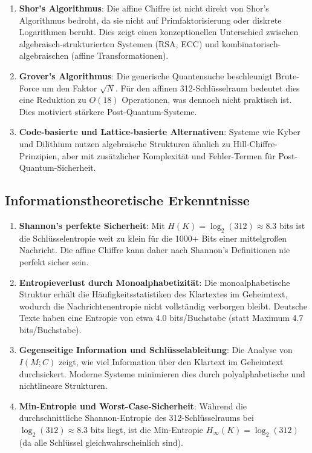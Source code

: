 ﻿\documentclass[12pt,a4paper]{article}
\begin{document}
	\begin{enumerate}
		\item \textbf{Shor's Algorithmus}: Die affine Chiffre ist nicht direkt von Shor's Algorithmus bedroht, da sie nicht auf Primfaktorisierung oder diskrete Logarithmen beruht. Dies zeigt einen konzeptionellen Unterschied zwischen algebraisch-strukturierten Systemen (RSA, ECC) und kombinatorisch-algebraischen (affine Transformationen).
		
		\item \textbf{Grover's Algorithmus}: Die generische Quantensuche beschleunigt Brute-Force um den Faktor $\sqrt{N}$. Für den affinen 312-Schlüsselraum bedeutet dies eine Reduktion zu $O(18)$ Operationen, was dennoch nicht praktisch ist. Dies motiviert stärkere Post-Quantum-Systeme.
		
		\item \textbf{Code-basierte und Lattice-basierte Alternativen}: Systeme wie Kyber und Dilithium nutzen algebraische Strukturen ähnlich zu Hill-Chiffre-Prinzipien, aber mit zusätzlicher Komplexität und Fehler-Termen für Post-Quantum-Sicherheit.
	\end{enumerate}
	
	\subsection{Informationstheoretische Erkenntnisse}
	
	\begin{enumerate}
		\item \textbf{Shannon's perfekte Sicherheit}: Mit $H(K) = \log_2(312) \approx 8.3$ bits ist die Schlüsselentropie weit zu klein für die 1000+ Bits einer mittelgroßen Nachricht. Die affine Chiffre kann daher nach Shannon's Definitionen nie perfekt sicher sein.
		
		\item \textbf{Entropieverlust durch Monoalphabetizität}: Die monoalphabetische Struktur erhält die Häufigkeitsstatistiken des Klartextes im Geheimtext, wodurch die Nachrichtenentropie nicht vollständig verborgen bleibt. Deutsche Texte haben eine Entropie von etwa 4.0 bits/Buchstabe (statt Maximum 4.7 bits/Buchstabe).
		
		\item \textbf{Gegenseitige Information und Schlüsselableitung}: Die Analyse von $I(M; C)$ zeigt, wie viel Information über den Klartext im Geheimtext durchsickert. Moderne Systeme minimieren dies durch polyalphabetische und nichtlineare Strukturen.
		
		\item \textbf{Min-Entropie und Worst-Case-Sicherheit}: Während die durchschnittliche Shannon-Entropie des 312-Schlüsselraums bei $\log_2(312) \approx 8.3$ bits liegt, ist die Min-Entropie $H_\infty(K) = \log_2(312)$ (da alle Schlüssel gleichwahrscheinlich sind).
	\end{enumerate}
	
\end{document}
